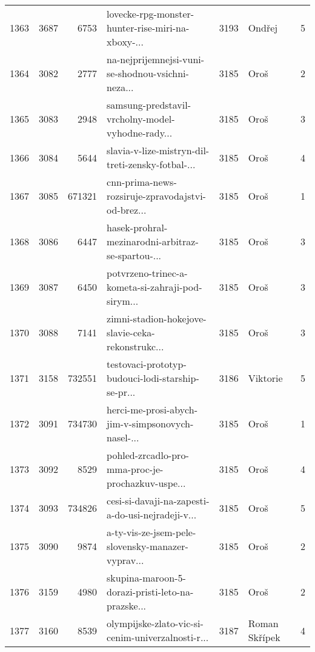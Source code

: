 \begin{tabular}{lrrlrlr}
1363 &       3687 &     6753 &  lovecke-rpg-monster-hunter-rise-miri-na-xboxy-... &     3193 &                       Ondřej &               5 \\
1364 &       3082 &     2777 &  na-nejprijemnejsi-vuni-se-shodnou-vsichni-neza... &     3185 &                         Oroš &               2 \\
1365 &       3083 &     2948 &  samsung-predstavil-vrcholny-model-vyhodne-rady... &     3185 &                         Oroš &               3 \\
1366 &       3084 &     5644 &  slavia-v-lize-mistryn-dil-treti-zensky-fotbal-... &     3185 &                         Oroš &               4 \\
1367 &       3085 &   671321 &  cnn-prima-news-rozsiruje-zpravodajstvi-od-brez... &     3185 &                         Oroš &               1 \\
1368 &       3086 &     6447 &  hasek-prohral-mezinarodni-arbitraz-se-spartou-... &     3185 &                         Oroš &               3 \\
1369 &       3087 &     6450 &  potvrzeno-trinec-a-kometa-si-zahraji-pod-sirym... &     3185 &                         Oroš &               3 \\
1370 &       3088 &     7141 &  zimni-stadion-hokejove-slavie-ceka-rekonstrukc... &     3185 &                         Oroš &               3 \\
1371 &       3158 &   732551 &  testovaci-prototyp-budouci-lodi-starship-se-pr... &     3186 &                     Viktorie &               5 \\
1372 &       3091 &   734730 &  herci-me-prosi-abych-jim-v-simpsonovych-nasel-... &     3185 &                         Oroš &               1 \\
1373 &       3092 &     8529 &  pohled-zrcadlo-pro-mma-proc-je-prochazkuv-uspe... &     3185 &                         Oroš &               4 \\
1374 &       3093 &   734826 &  cesi-si-davaji-na-zapesti-a-do-usi-nejradeji-v... &     3185 &                         Oroš &               5 \\
1375 &       3090 &     9874 &  a-ty-vis-ze-jsem-pele-slovensky-manazer-vyprav... &     3185 &                         Oroš &               2 \\
1376 &       3159 &     4980 &  skupina-maroon-5-dorazi-pristi-leto-na-prazske... &     3185 &                         Oroš &               2 \\
1377 &       3160 &     8539 &  olympijske-zlato-vic-si-cenim-univerzalnosti-r... &     3187 &                Roman Skřípek &               4 \\

\end{tabular}
